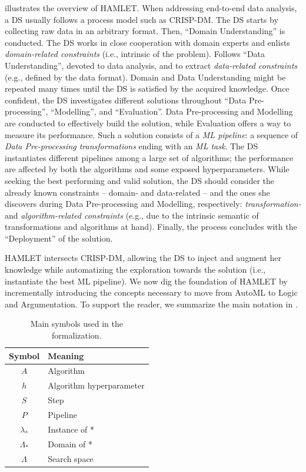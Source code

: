  illustrates the overview of HAMLET.
When addressing end-to-end data analysis, a DS usually follows a process model such as CRISP-DM.
The DS starts by collecting raw data in an arbitrary format.
Then, ``Domain Understanding'' is conducted.
The DS works in close cooperation with domain experts and enlists \emph{domain-related constraints} (i.e., intrinsic of the problem).
Follows ``Data Understanding'', devoted to data analysis, and to extract \emph{data-related constraints} (e.g., defined by the data format).
Domain and Data Understanding might be repeated many times until the DS is satisfied by the acquired knowledge.
Once confident, the DS investigates different solutions throughout ``Data Pre-processing'', ``Modelling'', and ``Evaluation''.
Data Pre-processing and Modelling are conducted to effectively build the solution, while Evaluation offers a way to measure its performance.
Such a solution consists of a \emph{ML pipeline}: a sequence of \emph{Data Pre-processing transformations} ending with an \emph{ML task}.
The DS instantiates different pipelines among a large set of algorithms; the performance are affected by both the algorithms and some exposed hyperparameters.
While seeking the best performing and valid solution, the DS should consider the already known constraints -- domain- and data-related -- and the ones she discovers during Data Pre-processing and Modelling, respectively: \emph{transformation-} and \emph{algorithm-related constraints} (e.g., due to the intrinsic semantic of transformations and algorithms at hand).
Finally, the process concludes with the ``Deployment'' of the solution.

HAMLET intersects CRISP-DM, allowing the DS to inject and augment her knowledge while automatizing the exploration towards the solution (i.e., instantiate the best ML pipeline). 
We now dig the foundation of HAMLET by incrementally introducing the concepts necessary to move from AutoML to Logic and Argumentation.
To support the reader, we summarize the main notation in .

\begin{table}[t]
    \centering
    \footnotesize
    \caption{Main symbols used in the formalization.}
    \begin{tabular}{cl}
        \toprule
        \textbf{Symbol} & \textbf{Meaning} \\
        \midrule
        $A$ & Algorithm \\
        $h$ & Algorithm hyperparameter \\
        $S$ & Step \\
        $P$ & Pipeline \\
        $\lambda_*$ & Instance of * \\
        $\Lambda_*$ & Domain of * \\
        $\Lambda$ & Search space \\
        \bottomrule
    \end{tabular}
    \label{hamlet-tbl:symbols}
\end{table}

